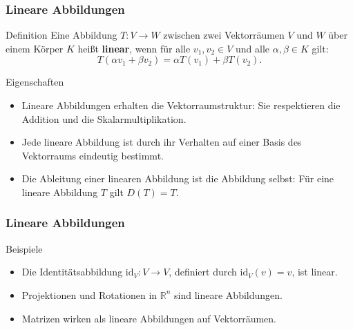 \documentclass{beamer}
\begin{document}
    

    

    \begin{frame}
        \frametitle{Lineare Abbildungen}
    
        \begin{block}{Definition}
            Eine Abbildung \( T: V \to W \) zwischen zwei Vektorräumen \( V \) und \( W \) über einem Körper \( K \) heißt \textbf{linear}, wenn für alle \( v_1, v_2 \in V \) und alle \( \alpha, \beta \in K \) gilt:
            \[
            T(\alpha v_1 + \beta v_2) = \alpha T(v_1) + \beta T(v_2).
            \]
        \end{block}
    
        \begin{block}{Eigenschaften}
            \begin{itemize}
                \item Lineare Abbildungen erhalten die Vektorraumstruktur: Sie respektieren die Addition und die Skalarmultiplikation.
                \item Jede lineare Abbildung ist durch ihr Verhalten auf einer Basis des Vektorraums eindeutig bestimmt.
                \item Die Ableitung einer linearen Abbildung ist die Abbildung selbst: Für eine lineare Abbildung \( T \) gilt \( D(T) = T \).
            \end{itemize}
        \end{block}
    
  
        
    \end{frame}
    
    \begin{frame}
        \frametitle{Lineare Abbildungen}
    
    
        \begin{block}{Beispiele}
            \begin{itemize}
                \item Die Identitätsabbildung \( \text{id}_V: V \to V \), definiert durch \( \text{id}_V(v) = v \), ist linear.
                \item Projektionen und Rotationen in \( \mathbb{R}^n \) sind lineare Abbildungen.
                \item Matrizen wirken als lineare Abbildungen auf Vektorräumen.
            \end{itemize}
        \end{block}
        
    \end{frame}
    
\end{document}
